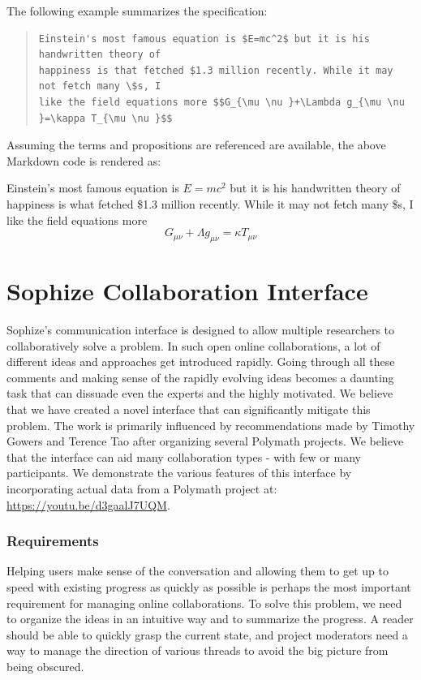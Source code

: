 \documentclass[a4paper]{article}
\begin{document}
The following example summarizes the specification:
\begin{quote}
\begin{verbatim} 
Einstein's most famous equation is $E=mc^2$ but it is his handwritten theory of 
happiness is that fetched $1.3 million recently. While it may not fetch many \$s, I 
like the field equations more $$G_{\mu \nu }+\Lambda g_{\mu \nu }=\kappa T_{\mu \nu }$$
\end{verbatim}
\end{quote}


Assuming the terms and propositions are referenced are available, the above Markdown code is rendered as:
\begin{mdframed}
Einstein's most famous equation is $E=mc^2$ but it is his handwritten theory of happiness is
what fetched \$1.3 million recently. While it may not fetch many \$s, I like the field
equations more $$G_{\mu \nu }+\Lambda g_{\mu \nu }=\kappa T_{\mu \nu }$$
\end{mdframed}

\section{Sophize Collaboration Interface}

Sophize's communication interface is designed to allow multiple researchers to collaboratively solve a problem. In such open online collaborations, a lot of different ideas and approaches get introduced rapidly. Going through all these comments and making sense of the rapidly evolving ideas becomes a daunting task that can dissuade even the experts and the highly motivated. We believe that we have created a novel interface that can significantly mitigate this problem. The work is primarily influenced by recommendations made by Timothy Gowers and Terence Tao after organizing several Polymath projects\cite{polymath_blog}. We believe that the interface can aid many collaboration types - with few or many participants. We demonstrate the various features of this interface by incorporating actual data from a Polymath project at: \url{https://youtu.be/d3gaalJ7UQM}.

\subsubsection*{Requirements}

Helping users make sense of the conversation and allowing them to get up to speed with existing progress as quickly as possible is perhaps the most important requirement for managing online collaborations. To solve this problem, we need to organize the ideas in an intuitive way and to summarize the progress. A reader should be able to quickly grasp the current state, and project moderators need a way to manage the direction of various threads to avoid the big picture from being obscured.
\end{document}
